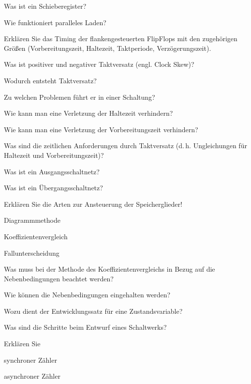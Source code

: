 \documentclass
[
  draft    = true,
  fontsize = 11pt,
  parskip  = half-,
  BCOR     = 0pt,
  DIV      = 11,
  ngerman,
  dvipsnames
]
{scrartcl}
\begin{document}
\begin{mytemize}
  \item Was ist ein Schieberegister?
  \item Wie funktioniert paralleles Laden?
  \item Erklären Sie das Timing der flankengesteuerten FlipFlops mit den zugehörigen Größen (Vorbereitungszeit, Haltezeit, Taktperiode, Verzögerungszeit).
  \item Was ist positiver und negativer Taktversatz (engl. Clock Skew)?
  \item Wodurch entsteht Taktversatz?
        \begin{mytemize}
          \item Zu welchen Problemen führt er in einer Schaltung?
        \end{mytemize}
  \item Wie kann man eine Verletzung der Haltezeit verhindern?
  \item Wie kann man eine Verletzung der Vorbereitungszeit verhindern?
  \item Was sind die zeitlichen Anforderungen durch Taktversatz (d.\,h. Ungleichungen für Haltezeit und Vorbereitungszeit)?
  \item Was ist ein Ausgangsschaltnetz?
  \item Was ist ein Übergangsschaltnetz?
  \item Erklären Sie die Arten zur Ansteuerung der Speicherglieder!
        \begin{mytemize}
          \item Diagrammmethode
          \item Koeffizientenvergleich
          \item Fallunterscheidung
        \end{mytemize}
  \item Was muss bei der Methode des Koeffizientenvergleichs in Bezug auf die Nebenbedingungen beachtet werden?
        \begin{mytemize}
          \item Wie können die Nebenbedingungen eingehalten werden?
        \end{mytemize}
  \item Wozu dient der Entwicklungssatz für eine Zustandsvariable?
  \item Was sind die Schritte beim Entwurf eines Schaltwerks?
  \item Erklären Sie
        \begin{mytemize}
          \item synchroner Zähler
          \item asynchroner Zähler

\end{mytemize}
\end{mytemize}
\end{document}
